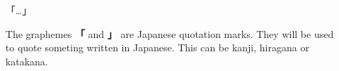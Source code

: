 \begin{itemize}
%

    \item[「\ldots」]

            The graphemes \textbf{「} and \textbf{」} are Japanese quotation
            marks. They will be used to quote someting written in Japanese.
            This can be kanji, hiragana or katakana.



\end{itemize}
